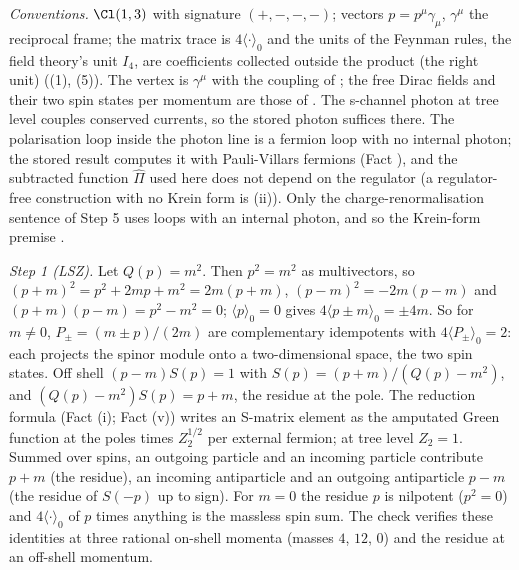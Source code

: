 \emph{Conventions.} $\Cl(1,3)$ with signature $(+,-,-,-)$; vectors $p = p^{\mu}\gamma_{\mu}$, $\gamma^{\mu}$ the reciprocal frame; the matrix trace is $4\langle\cdot\rangle_{0}$ and the units of the Feynman rules, the field theory's unit $I_{4}$, are coefficients collected outside the product (the right unit) ((1), (5)). The vertex is $\gamma^{\mu}$ with the coupling of ; the free Dirac fields and their two spin states per momentum are those of . The s-channel photon at tree level couples conserved currents, so the stored photon suffices there. The polarisation loop inside the photon line is a fermion loop with no internal photon; the stored result computes it with Pauli-Villars fermions (Fact ), and the subtracted function $\hat\Pi$ used here does not depend on the regulator (a regulator-free construction with no Krein form is (ii)). Only the charge-renormalisation sentence of Step 5 uses loops with an internal photon, and so the Krein-form premise .

\emph{Step 1 (LSZ).} Let $Q(p) = m^{2}$. Then $p^{2} = m^{2}$ as multivectors, so $(p + m)^{2} = p^{2} + 2mp + m^{2} = 2m(p + m)$, $(p - m)^{2} = -2m(p - m)$ and $(p + m)(p - m) = p^{2} - m^{2} = 0$; $\langle p\rangle_{0} = 0$ gives $4\langle p \pm m\rangle_{0} = \pm 4m$. So for $m \neq 0$, $P_{\pm} = (m \pm p)/(2m)$ are complementary idempotents with $4\langle P_{\pm}\rangle_{0} = 2$: each projects the spinor module onto a two-dimensional space, the two spin states. Off shell $(p - m)S(p) = 1$ with $S(p) = (p + m)/(Q(p) - m^{2})$, and $(Q(p) - m^{2})S(p) = p + m$, the residue at the pole. The reduction formula \cite{LSZ1955} (Fact (i); Fact (v)) writes an S-matrix element as the amputated Green function at the poles times $Z_{2}^{1/2}$ per external fermion; at tree level $Z_{2} = 1$. Summed over spins, an outgoing particle and an incoming particle contribute $p + m$ (the residue), an incoming antiparticle and an outgoing antiparticle $p - m$ (the residue of $S(-p)$ up to sign). For $m = 0$ the residue $p$ is nilpotent ($p^{2} = 0$) and $4\langle\cdot\rangle_{0}$ of $p$ times anything is the massless spin sum. The check verifies these identities at three rational on-shell momenta (masses $4$, $12$, $0$) and the residue at an off-shell momentum.


